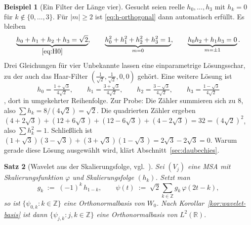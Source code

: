 \documentclass[a4paper,11pt,bibliography=totoc,listof=totoc,headinclude=true,cleardoublepage=empty,oneside]{scrbook}
\theoremstyle{plain}
\newtheorem{Satz}{Satz}[chapter]
\theoremstyle{definition}
\newtheorem{Beispiel}[Satz]{Beispiel}
\newcommand{\R}{\mathbb{R}}
\newcommand{\Z}{\mathbb{Z}}
\newcommand{\LZwei}{L^2(\R)}
\begin{document}
\begin{Beispiel}[Ein Filter der Länge vier]
\label{bsp:db2-filter}
Gesucht seien reelle $h_0,\dots,h_3$ mit $h_k = 0$ für $k\notin\{0,\dots,3\}$.
Für $\lvert m\rvert\ge2$ ist \eqref{eq:h-orthogonal} dann automatisch erfüllt.
Es bleiben
\[
  \underbrace{h_0+h_1+h_2+h_3 = \sqrt2}_{\eqref{eq:H0}}, \qquad
  \underbrace{h_0^2+h_1^2+h_2^2+h_3^2 = 1}_{m=0}, \qquad
  \underbrace{h_0h_2+h_1h_3 = 0}_{m=\pm1} .
\]
Drei Gleichungen für vier Unbekannte lassen eine einparametrige Lösungsschar,
zu der auch das Haar-Filter $(\tfrac{1}{\sqrt2},\tfrac1{\sqrt2},0,0)$ gehört.
Eine weitere Lösung ist
\begin{equation}
\label{eq:db2-koeff}
  h_0 = \tfrac{1+\sqrt3}{4\sqrt2},\qquad
  h_1 = \tfrac{3+\sqrt3}{4\sqrt2},\qquad
  h_2 = \tfrac{3-\sqrt3}{4\sqrt2},\qquad
  h_3 = \tfrac{1-\sqrt3}{4\sqrt2}
\end{equation}
\cite[Tabelle~2.3]{lmr}, %
dort in umgekehrter Reihenfolge. Zur Probe: Die Zähler summieren sich zu $8$,
also $\sum h_k = 8/(4\sqrt2) = \sqrt2$. Die quadrierten Zähler ergeben
$(4+2\sqrt3)+(12+6\sqrt3)+(12-6\sqrt3)+(4-2\sqrt3) = 32 = (4\sqrt2)^2$, also
$\sum h_k^2 = 1$. Schlie\ss{}lich ist
$(1+\sqrt3)(3-\sqrt3)+(3+\sqrt3)(1-\sqrt3) = 2\sqrt3-2\sqrt3 = 0$. Warum gerade
diese Lösung ausgewählt wird, klärt Abschnitt~\ref{sec:daubechies}.
\end{Beispiel}


\begin{Satz}[Wavelet aus der Skalierungsfolge, vgl.\ {\cite[Satz~2.2.10]{lmr}}] %
\label{satz:wavelet-aus-h}
Sei $(V_j)$ eine MSA mit Skalierungsfunktion $\varphi$ und Skalierungsfolge
$(h_k)$. Setzt man
\begin{equation}
\label{eq:g-aus-h}
  g_k \;:=\; (-1)^k\,h_{1-k}, \qquad
  \psi(t) \;:=\; \sqrt2\sum_{k\in\Z} g_k\,\varphi(2t-k),
\end{equation}
so ist $\{\psi_{0,k} : k\in\Z\}$ eine Orthonormalbasis von $W_0$. Nach
Korollar~\ref{kor:wavelet-basis} ist dann $\{\psi_{j,k} : j,k\in\Z\}$ eine
Orthonormalbasis von $\LZwei$.
\end{Satz}
\end{document}
